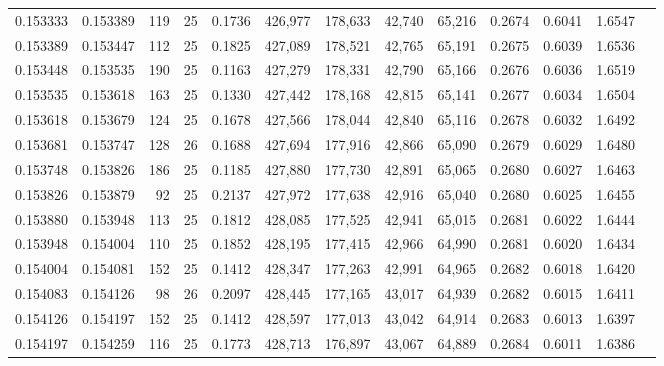 \begin{tabular}{rrrrrrrrrrrrr}
0.153333 & 0.153389 &   119 &  25 &                                     0.1736 & 426,977 & 178,633 &  42,740 &  65,216 & 0.2674 & 0.6041 & 1.6547 \\
0.153389 & 0.153447 &   112 &  25 &                                     0.1825 & 427,089 & 178,521 &  42,765 &  65,191 & 0.2675 & 0.6039 & 1.6536 \\
0.153448 & 0.153535 &   190 &  25 &                                     0.1163 & 427,279 & 178,331 &  42,790 &  65,166 & 0.2676 & 0.6036 & 1.6519 \\
0.153535 & 0.153618 &   163 &  25 &                                     0.1330 & 427,442 & 178,168 &  42,815 &  65,141 & 0.2677 & 0.6034 & 1.6504 \\
0.153618 & 0.153679 &   124 &  25 &                                     0.1678 & 427,566 & 178,044 &  42,840 &  65,116 & 0.2678 & 0.6032 & 1.6492 \\
0.153681 & 0.153747 &   128 &  26 &                                     0.1688 & 427,694 & 177,916 &  42,866 &  65,090 & 0.2679 & 0.6029 & 1.6480 \\
0.153748 & 0.153826 &   186 &  25 &                                     0.1185 & 427,880 & 177,730 &  42,891 &  65,065 & 0.2680 & 0.6027 & 1.6463 \\
0.153826 & 0.153879 &    92 &  25 &                                     0.2137 & 427,972 & 177,638 &  42,916 &  65,040 & 0.2680 & 0.6025 & 1.6455 \\
0.153880 & 0.153948 &   113 &  25 &                                     0.1812 & 428,085 & 177,525 &  42,941 &  65,015 & 0.2681 & 0.6022 & 1.6444 \\
0.153948 & 0.154004 &   110 &  25 &                                     0.1852 & 428,195 & 177,415 &  42,966 &  64,990 & 0.2681 & 0.6020 & 1.6434 \\
0.154004 & 0.154081 &   152 &  25 &                                     0.1412 & 428,347 & 177,263 &  42,991 &  64,965 & 0.2682 & 0.6018 & 1.6420 \\
0.154083 & 0.154126 &    98 &  26 &                                     0.2097 & 428,445 & 177,165 &  43,017 &  64,939 & 0.2682 & 0.6015 & 1.6411 \\
0.154126 & 0.154197 &   152 &  25 &                                     0.1412 & 428,597 & 177,013 &  43,042 &  64,914 & 0.2683 & 0.6013 & 1.6397 \\
0.154197 & 0.154259 &   116 &  25 &                                     0.1773 & 428,713 & 176,897 &  43,067 &  64,889 & 0.2684 & 0.6011 & 1.6386 \\

\end{tabular}
